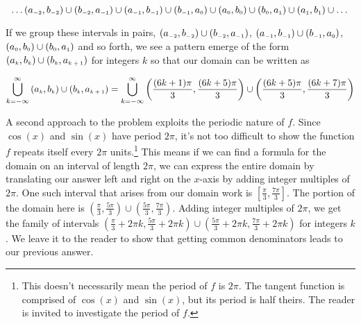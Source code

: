 \begin{ex}
\begin{enumerate}
\[\ldots  \left(a_{\mbox{\tiny $-2$}}, b_{\mbox{\tiny $-2$}}  \right) \cup \left(b_{\mbox{\tiny $-2$}}, a_{\mbox{\tiny $-1$}}  \right)\cup \left(a_{\mbox{\tiny $-1$}}, b_{\mbox{\tiny $-1$}}  \right)\cup \left(b_{\mbox{\tiny $-1$}}, a_{\mbox{\tiny $0$}}  \right)\cup \left(a_{\mbox{\tiny $0$}}, b_{\mbox{\tiny $0$}}  \right)\cup \left(b_{\mbox{\tiny $0$}}, a_{\mbox{\tiny $1$}}  \right)\cup \left(a_{\mbox{\tiny $1$}}, b_{\mbox{\tiny $1$}}  \right)\cup \dots \]

If we group these intervals in pairs, $ \left(a_{\mbox{\tiny $-2$}}, b_{\mbox{\tiny $-2$}}  \right) \cup \left(b_{\mbox{\tiny $-2$}}, a_{\mbox{\tiny $-1$}}  \right)$, $\left(a_{\mbox{\tiny $-1$}}, b_{\mbox{\tiny $-1$}}  \right)\cup \left(b_{\mbox{\tiny $-1$}}, a_{\mbox{\tiny $0$}}  \right)$, $\left(a_{\mbox{\tiny $0$}}, b_{\mbox{\tiny $0$}}  \right)\cup \left(b_{\mbox{\tiny $0$}}, a_{\mbox{\tiny $1$}}  \right)$ and so forth, we see a pattern emerge of the form  $\left(a_{\mbox{\tiny $k$}}, b_{\mbox{\tiny $k$}}  \right)\cup \left(b_{\mbox{\tiny $k$}}, a_{\mbox{\tiny $k+1$}}  \right)$ for integers $k$ so that our domain can be written as 

\[ \bigcup_{k = -\infty}^{\infty} \left(a_{\mbox{\tiny $k$}}, b_{\mbox{\tiny $k$}}  \right)\cup \left(b_{\mbox{\tiny $k$}}, a_{\mbox{\tiny $k+1$}}  \right) =  \bigcup_{k = -\infty}^{\infty} \left(\frac{(6k+1)\pi}{3}, \frac{(6k+5) \pi}{3}  \right)\cup \left(\frac{(6k+5) \pi}{3}, \frac{(6k+7)\pi}{3}  \right) \]

A second approach to the problem exploits the periodic nature of $f$.  Since $\cos(x)$ and $\sin(x)$ have period $2\pi$, it's not too difficult to show the function $f$ repeats itself every $2\pi$ units.\footnote{This doesn't necessarily mean the period of $f$ is $2\pi$.  The tangent function is comprised of $\cos(x)$ and $\sin(x)$, but its period is half theirs.  The reader is invited to investigate the period of $f$.}  This means if we can find a formula for the domain on an interval of length $2\pi$, we can express the entire domain by translating our answer left and right on the $x$-axis by adding integer multiples of $2\pi$. One such interval that arises from our domain work is  $\left[\frac{\pi}{3}, \frac{7\pi}{3}\right]$. The portion of the domain here is  $\left(\frac{\pi}{3}, \frac{5\pi}{3}\right) \cup \left(\frac{5\pi}{3}, \frac{7\pi}{3}\right)$.  Adding integer multiples of $2\pi$, we get the family of intervals  $\left(\frac{\pi}{3} + 2\pi k, \frac{5\pi}{3} + 2\pi k \right) \cup \left(\frac{5\pi}{3} + 2\pi k, \frac{7\pi}{3} + 2\pi k\right)$ for integers $k$.  We leave it to the reader to show that getting common denominators leads to our previous answer.


\end{enumerate}
\end{ex}
